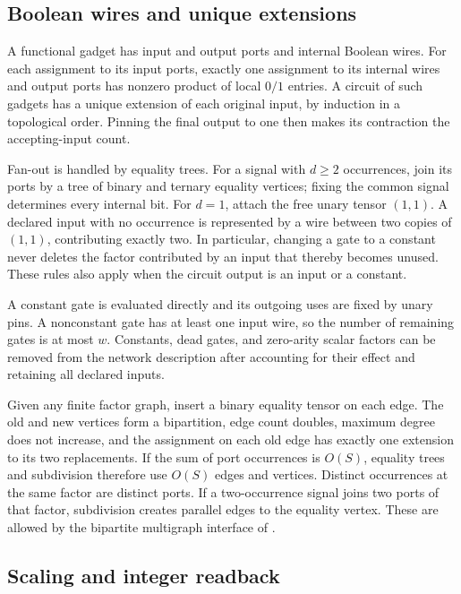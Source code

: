 \subsection{Boolean wires and unique extensions}

A functional gadget has input and output ports and internal Boolean
wires. For each assignment to its input ports, exactly one assignment
to its internal wires and output ports has nonzero product of local
$0/1$ entries. A circuit of such gadgets has a unique extension of each
original input, by induction in a topological order. Pinning the final
output to one then makes its contraction the accepting-input count.

Fan-out is handled by equality trees. For a signal with $d\ge2$
occurrences, join its ports by a tree of binary and ternary equality
vertices; fixing the common signal determines every internal bit.
For $d=1$, attach the free unary tensor $(1,1)$. A declared input
with no occurrence is represented by a wire between two copies of
$(1,1)$, contributing exactly two. In particular, changing a gate to a
constant never deletes the factor contributed by an input that thereby
becomes unused. These rules also apply when the circuit output is an
input or a constant.

A constant gate is evaluated directly and its outgoing uses are fixed
by unary pins. A nonconstant gate has at least one input wire, so the
number of remaining gates is at most $w$. Constants, dead gates, and
zero-arity scalar factors can be removed from the network description
after accounting for their effect and retaining all declared inputs.

Given any finite factor graph, insert a binary equality tensor on
each edge. The old and new vertices form a bipartition, edge count
doubles, maximum degree does not increase, and the assignment on each
old edge has exactly one extension to its two replacements. If the
sum of port occurrences is $O(S)$, equality trees and subdivision
therefore use $O(S)$ edges and vertices.
Distinct occurrences at the same factor are distinct ports. If a
two-occurrence signal joins two ports of that factor, subdivision
creates parallel edges to the equality vertex. These are allowed by
the bipartite multigraph interface of \HTC.

\subsection{Scaling and integer readback}

